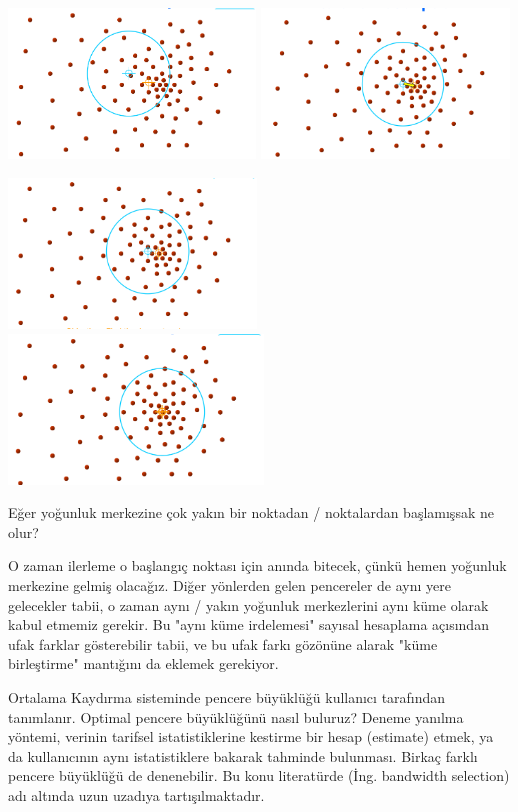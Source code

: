 \documentclass[12pt,fleqn]{article}\usepackage{../../common}
\begin{document}
\includegraphics[height=4cm]{mean_4.png}
\includegraphics[height=4cm]{mean_5.png}

\includegraphics[height=4cm]{mean_6.png}
\includegraphics[height=4cm]{mean_7.png}

Eğer yoğunluk merkezine çok yakın bir noktadan / noktalardan
başlamışsak ne olur?

O zaman ilerleme o başlangıç noktası için anında bitecek, çünkü hemen
yoğunluk merkezine gelmiş olacağız. Diğer yönlerden gelen pencereler
de aynı yere gelecekler tabii, o zaman aynı / yakın yoğunluk
merkezlerini aynı küme olarak kabul etmemiz gerekir. Bu "aynı küme
irdelemesi" sayısal hesaplama açısından ufak farklar gösterebilir
tabii, ve bu ufak farkı gözönüne alarak "küme birleştirme" mantığını da
eklemek gerekiyor.

Ortalama Kaydırma sisteminde pencere büyüklüğü kullanıcı tarafından
tanımlanır.  Optimal pencere büyüklüğünü nasıl buluruz? Deneme yanılma
yöntemi, verinin tarifsel istatistiklerine kestirme bir hesap (estimate)
etmek, ya da kullanıcının aynı istatistiklere bakarak tahminde
bulunması. Birkaç farklı pencere büyüklüğü de denenebilir. Bu konu
literatürde (İng. bandwidth selection) adı altında uzun uzadıya
tartışılmaktadır.
\end{document}
